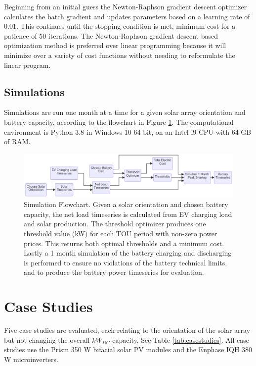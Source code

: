 \documentclass[
]{article}
\begin{document}
Beginning from an initial guess the Newton-Raphson gradient descent
optimizer calculates the batch gradient and updates parameters based on
a learning rate of 0.01. This continues until the stopping condition is
met, minimum cost for a patience of 50 iterations. The Newton-Raphson
gradient descent based optimization method is preferred over linear
programming because it will minimize over a variety of cost functions
without needing to reformulate the linear program.

\hypertarget{simulations}{%
  \subsection{Simulations}\label{simulations}}

Simulations are run one month at a time for a given solar array
orientation and battery capacity, according to the flowchart in Figure \ref{fig:simulation-flowchart}.
The computational environment is Python 3.8 in Windows 10 64-bit, on
an Intel i9 CPU with 64 GB of RAM.

\begin{figure}
  \centering
  \includegraphics[width=15cm,height=\textheight]{./images/simulation flowchart.png}
  \caption{Simulation Flowchart. Given a solar orientation
  and chosen battery capacity, the net load timeseries is calculated from
  EV charging load and solar production. The threshold optimizer produces
  one threshold value (kW) for each TOU period with non-zero power prices.
  This returns both optimal thresholds and a minimum cost. Lastly a 1
  month simulation of the battery charging and discharging is performed to
  ensure no violations of the battery technical limits, and to produce the
  battery power timeseries for evaluation.}
  \label{fig:simulation-flowchart}
\end{figure}

\hypertarget{case-studies}{%
  \section{Case Studies}\label{case-studies}}

Five case studies are evaluated, each relating to the orientation of the
solar array but not changing the overall \(kW_{DC}\) capacity. See Table \ref{tab:casestudies}. All case
studies use the Prism 350 W bifacial solar PV modules and the Enphase
IQH 380 W microinverters.
\end{document}
